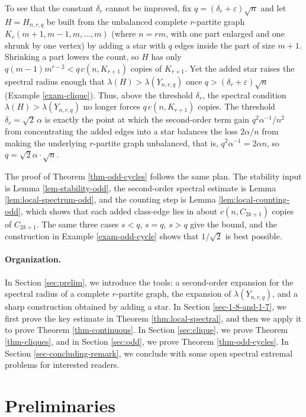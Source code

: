 \documentclass[11pt,a4paper]{article}
\theoremstyle{definition}
\theoremstyle{plain}
\newcommand{\eps}{\varepsilon}
\begin{document}
To see that the constant $\delta_r$ cannot be improved, fix
$q=(\delta_r+\eps)\sqrt n$ and let $H=H_{n,r,q}$ be built
from the unbalanced complete $r$-partite graph
$K_r(m+1,m-1,m,\ldots,m)$ (where $n=rm$, with one part
enlarged and one shrunk by one vertex) by adding a star
with $q$ edges inside the part of size $m+1$. Shrinking a
part lowers the count, so $H$ has only
$q(m-1)m^{r-2}<q\,c(n,K_{r+1})$ copies of $K_{r+1}$. Yet
the added star raises the spectral radius enough that
$\lambda(H)>\lambda(Y_{n,r,q})$ once
$q>(\delta_r+\eps)\sqrt n$ (Example \ref{exam-clique}). Thus, 
above the threshold $\delta_r$, the spectral condition $\lambda(H)>\lambda(Y_{n,r,q})$ no longer
forces $q\,c(n,K_{r+1})$ copies. 
The threshold $\delta_r=\sqrt2\,\alpha$ is exactly the point at which the second-order term gain $q^2\alpha^{-1}/n^2$ 
from concentrating the added edges into a star balances the loss $2\alpha /n$ from making the underlying $r$-partite graph unbalanced, that is, $q^2 \alpha^{-1}=2\alpha n$, so $q=\sqrt{2} \alpha  \cdot \sqrt{n}$.  


The proof of Theorem \ref{thm-odd-cycles} follows the same
plan. The stability input is Lemma \ref{lem-stability-odd},
the second-order spectral estimate is
Lemma \ref{lem:local-spectrum-odd}, and the counting step is
Lemma \ref{lem:local-counting-odd}, which shows that each
added class-edge lies in about $c(n,C_{2k+1})$ copies of
$C_{2k+1}$. The same three cases $s<q$, $s=q$, $s>q$ give
the bound, and the construction in
Example \ref{exam-odd-cycle} shows that $1/\sqrt2$ is best
possible. 





\paragraph{Organization.}  
In Section \ref{sec:prelim}, we introduce the tools: 
a second-order expansion for the spectral radius of a complete $r$-partite graph, 
the expansion of $\lambda(Y_{n,r,q})$, 
and a sharp construction obtained by adding a star. 
In Section \ref{sec-1-8-and-1-7}, 
we first prove the key estimate in Theorem \ref{thm:local-spectral}, and then we apply it to prove Theorem \ref{thm-continuous}. 
In Section \ref{sec:clique}, we prove
Theorem \ref{thm-cliques}, and in Section \ref{sec:odd}, we prove
Theorem \ref{thm-odd-cycles}. 
In Section \ref{sec-concluding-remark}, we conclude with some open spectral extremal problems for interested readers. 


\section{Preliminaries} 
\end{document}
